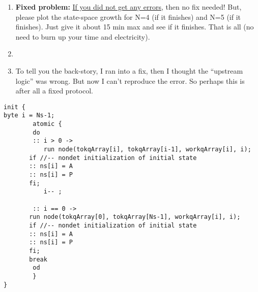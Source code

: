 \documentclass[11pt]{article}
\begin{document}
\begin{enumerate}
\begin{enumerate}
\begin{enumerate}
    \item {\bf Fixed problem:\/} \underline{If you did not get any errors}, then no fix needed!
      But, please plot the state-space growth for N=4 (if it finishes) and N=5 (if it finishes). Just give
      it about 15 min max and see if it finishes. That is all (no need to burn up your time and electricity).
      
    \item[]
            \item[]
      To tell you
      the back-story, I ran into a fix, then I thought the ``upstream logic'' was wrong.
      But now I can't reproduce the error. So perhaps this is after all a fixed protocol.

    \end{enumerate}
  \end{enumerate}

  \begin{scriptsize}  
\begin{verbatim}
init {
byte i = Ns-1;
        atomic {
        do
        :: i > 0 ->     
           run node(tokqArray[i], tokqArray[i-1], workqArray[i], i);
	   if //-- nondet initialization of initial state
	   :: ns[i] = A 
	   :: ns[i] = P
	   fi;
           i-- ;	   
	   
        :: i == 0 ->
	   run node(tokqArray[0], tokqArray[Ns-1], workqArray[i], i);
	   if //-- nondet initialization of initial state
	   :: ns[i] = A
	   :: ns[i] = P
	   fi;	   
	   break
        od
        }
}
\end{verbatim}
  \end{scriptsize}
  

\begin{minipage}{\minpagw}
\end{minipage}

\end{enumerate}
\end{document}
